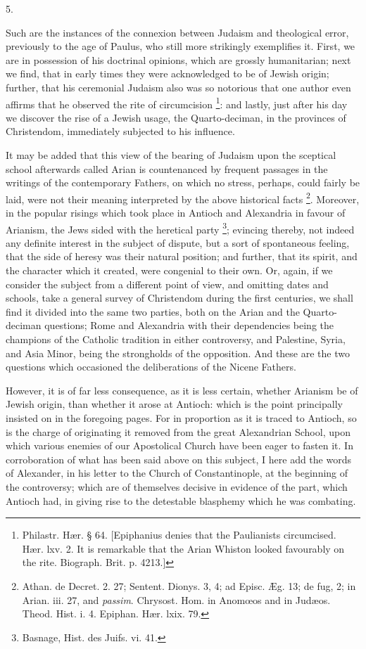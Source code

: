 5.

Such are the instances of the connexion between Judaism and
theological error, previously to the age of Paulus, who still more
strikingly exemplifies it. First, we are in possession of his
doctrinal opinions, which are grossly humanitarian; next we find, that
in early times they were acknowledged to be of Jewish origin; further,
that his ceremonial Judaism also was so notorious that one author even
affirms that he observed the rite of circumcision \footnote{Philastr. Hær. § 64. [Epiphanius denies
that the Paulianists circumcised. Hær. lxv. 2. It is remarkable that
the Arian Whiston looked favourably on the rite. Biograph. Brit. p.
4213.]}: and lastly, just after his day we discover the rise of a
Jewish usage, the Quarto-deciman, in the provinces of Christendom,
immediately subjected to his influence.

It may be added that this view of the bearing of Judaism upon the
sceptical school afterwards called Arian is countenanced by frequent
passages in the writings of the contemporary Fathers, on which no
stress, perhaps, could fairly be laid, were not their meaning
interpreted by the above historical facts \footnote{Athan. de Decret. 2. 27; Sentent. Dionys.
3, 4; ad Episc. Æg. 13; de fug, 2; in Arian. iii. 27, and \emph{passim}.
Chrysost. Hom. in Anomœos and in Judæos. Theod. Hist. i. 4. Epiphan.
Hær. lxix. 79.}. Moreover, in the popular risings which took place in Antioch
and Alexandria in favour of Arianism, the Jews sided with the
heretical party \footnote{Basnage, Hist. des Juifs. vi. 41.};
evincing thereby, not indeed any definite interest in the subject of
dispute, but a sort of spontaneous feeling, that the side of heresy
was their natural position; and further, that its spirit, and the
character which it created, were congenial to their own. Or, again, if
we consider the subject from a different point of view, and omitting
dates and schools, take a general survey of Christendom during the
first centuries, we shall find it divided into the same two parties,
both on the Arian and the Quarto-deciman questions; Rome and
Alexandria with their dependencies being the champions of the Catholic
tradition in either controversy, and Palestine, Syria, and Asia Minor,
being the strongholds of the opposition. And these are the two
questions which occasioned the deliberations of the Nicene Fathers.

However, it is of far less consequence, as it is less certain,
whether Arianism be of Jewish origin, than whether it arose at
Antioch: which is the point principally insisted on in the foregoing
pages. For in proportion as it is traced to Antioch, so is the charge
of originating it removed from the great Alexandrian School, upon
which various enemies of our Apostolical Church have been eager to
fasten it. In corroboration of what has been said above on this
subject, I here add the words of Alexander, in his letter to the
Church of Constantinople, at the beginning of the controversy;
which are of themselves decisive in evidence of the part, which
Antioch had, in giving rise to the detestable blasphemy which he was
combating.

